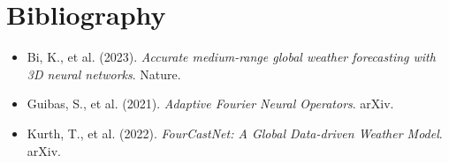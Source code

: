 \section*{Bibliography}
\begin{itemize}
    \item Bi, K., et al. (2023). \textit{Accurate medium-range global weather forecasting with 3D neural networks}. Nature.
    \item Guibas, S., et al. (2021). \textit{Adaptive Fourier Neural Operators}. arXiv.
    \item Kurth, T., et al. (2022). \textit{FourCastNet: A Global Data-driven Weather Model}. arXiv.
\end{itemize}
